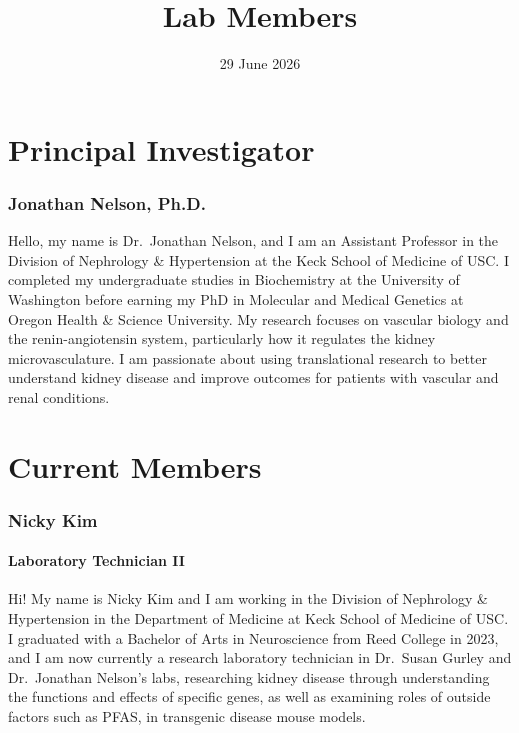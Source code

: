 \documentclass[
]{article}
\title{Lab Members}
\author{}
\date{\vspace{-2.5em}29 June 2026}
\begin{document}
\maketitle

{
\setcounter{tocdepth}{5}
\tableofcontents
}
\section{Principal Investigator}\label{principal-investigator}

\subsubsection{Jonathan Nelson, Ph.D.}\label{jonathan-nelson-ph.d.}

Hello, my name is Dr.~Jonathan Nelson, and I am an Assistant Professor
in the Division of Nephrology \& Hypertension at the Keck School of
Medicine of USC. I completed my undergraduate studies in Biochemistry at
the University of Washington before earning my PhD in Molecular and
Medical Genetics at Oregon Health \& Science University. My research
focuses on vascular biology and the renin-angiotensin system,
particularly how it regulates the kidney microvasculature. I am
passionate about using translational research to better understand
kidney disease and improve outcomes for patients with vascular and renal
conditions.

\section{Current Members}\label{current-members}

\subsubsection{Nicky Kim}\label{nicky-kim}

\paragraph{Laboratory Technician II}\label{laboratory-technician-ii}

Hi! My name is Nicky Kim and I am working in the Division of Nephrology
\& Hypertension in the Department of Medicine at Keck School of Medicine
of USC. I graduated with a Bachelor of Arts in Neuroscience from Reed
College in 2023, and I am now currently a research laboratory technician
in Dr.~Susan Gurley and Dr.~Jonathan Nelson's labs, researching kidney
disease through understanding the functions and effects of specific
genes, as well as examining roles of outside factors such as PFAS, in
transgenic disease mouse models.
\end{document}
